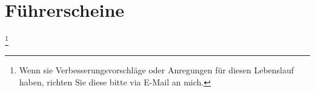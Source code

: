 \documentclass[11pt,a4paper,sans]{moderncv}        %
\newcommand\blfootnote[1]{%
  \begingroup
  \renewcommand\thefootnote{}\footnote{#1}%
  \addtocounter{footnote}{-1}%
  \endgroup
}
\renewcommand*{\bibliographyitemlabel}{[\arabic{enumiv}]}
\begin{document}
\section{Führerscheine}



\blfootnote{Wenn sie Verbesserungsvorschläge oder Anregungen für diesen Lebenslauf haben, richten Sie diese bitte via E-Mail an mich.}

\clearpage
\end{document}
